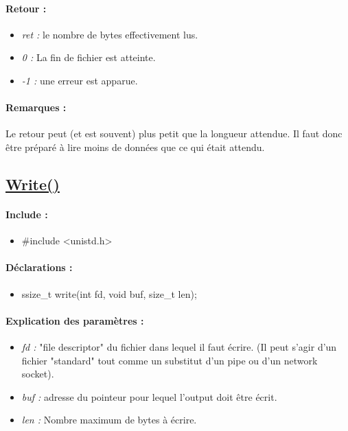 \documentclass{article}[12pt]
\begin{document}
\paragraph{Retour : }
\begin{itemize}
	\item \emph{ret : } le nombre de bytes effectivement lus.
	\item \emph{0 : } La fin de fichier est atteinte.
	\item \emph{-1 : } une erreur est apparue.
\end{itemize}
\paragraph{Remarques : }
Le retour peut (et est souvent) plus petit que la longueur attendue. Il faut donc être préparé à lire moins de données que ce qui était attendu. 
\subsection{\href{http://jp.barralis.com/linux-man/man2/write.2.php}{Write()}}
\paragraph{Include : }
\begin{itemize}
	\item \#include <unistd.h>
\end{itemize}
\paragraph{Déclarations : }
\begin{itemize}
	\item ssize\_t write(int fd, void \* buf, size\_t len);
\end{itemize}
\paragraph{Explication des paramètres : }
\begin{itemize}
	\item \emph{fd : } "file descriptor" du fichier dans lequel il faut écrire. (Il peut s'agir d'un fichier "standard" tout comme un substitut d'un pipe ou d'un network socket).
	\item \emph{buf : } adresse du pointeur pour lequel l'output doit être écrit.
	\item \emph{len : } Nombre maximum de bytes à écrire.
\end{itemize}
\end{document}
